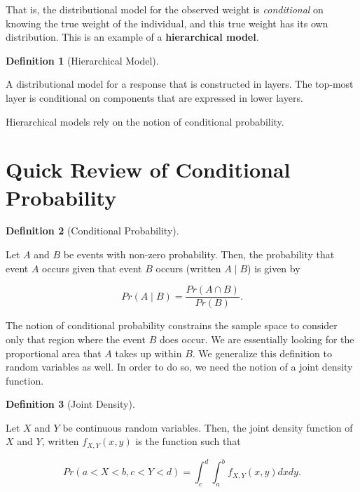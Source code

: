 \documentclass[
  letterpaper,
  DIV=11,
  numbers=noendperiod]{scrreprt}
\theoremstyle{definition}
\newtheorem{definition}{Definition}[chapter]
\theoremstyle{plain}
\theoremstyle{definition}
\theoremstyle{remark}
\begin{document}
That is, the distributional model for the observed weight is
\emph{conditional} on knowing the true weight of the individual, and
this true weight has its own distribution. This is an example of a
\textbf{hierarchical model}.

\begin{definition}[Hierarchical
Model]\protect\hypertarget{def-hierarchical-model}{}\label{def-hierarchical-model}

A distributional model for a response that is constructed in layers. The
top-most layer is conditional on components that are expressed in lower
layers.

\end{definition}

Hierarchical models rely on the notion of conditional probability.

\section{Quick Review of Conditional
Probability}\label{quick-review-of-conditional-probability}

\begin{definition}[Conditional
Probability]\protect\hypertarget{def-conditional-probability}{}\label{def-conditional-probability}

Let \(A\) and \(B\) be events with non-zero probability. Then, the
probability that event \(A\) occurs given that event \(B\) occurs
(written \(A \mid B\)) is given by

\[Pr(A \mid B) = \frac{Pr(A \cap B)}{Pr(B)}.\]

\end{definition}

The notion of conditional probability constrains the sample space to
consider only that region where the event \(B\) does occur. We are
essentially looking for the proportional area that \(A\) takes up within
\(B\). We generalize this definition to random variables as well. In
order to do so, we need the notion of a joint density function.

\begin{definition}[Joint
Density]\protect\hypertarget{def-joint-density}{}\label{def-joint-density}

Let \(X\) and \(Y\) be continuous random variables. Then, the joint
density function of \(X\) and \(Y\), written \(f_{X,Y}(x,y)\) is the
function such that

\[Pr(a < X < b, c < Y < d) = \int_{c}^{d} \int_{a}^{b} f_{X,Y}(x,y) dx dy.\]

\end{definition}
\end{document}
